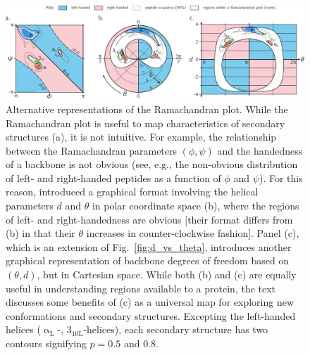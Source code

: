 \documentclass[fleqn,10pt,lineno]{wlpeerj} %
\newcommand{\n}[1]{{\color{black}#1}} %
\newcommand{\Fig}[1]{Fig.~\ref{#1}}
\begin{document}
\begin{figure}[t!]
\begin{adjustwidth}{-1in}{0in} %
\centering
\includegraphics[width=1.0\linewidth]{./figures/various_2d_distributions.pdf}
\caption{\label{fig:alternatives} 
\n{Alternative representations of the Ramachandran plot. While the Ramachandran plot is useful to map characteristics of secondary structures (a), it is not intuitive. For example, the relationship between the Ramachandran parameters $(\phi,\psi)$ and the handedness of a backbone is not obvious (see, e.g., the non-obvious distribution of left- and right-handed peptides as a function of $\phi$ and $\psi$). For this reason, \cite{Zacharias2013} introduced a graphical format involving the helical parameters $d$ and $\theta$ in polar coordinate space (b), where the regions of left- and right-handedness are obvious [their format differs from (b) in that their $\theta$ increases in counter-clockwise fashion]. Panel (c), which is an extension of \Fig{fig:d_vs_theta}, introduces another graphical representation of backbone degrees of freedom based on $(\theta,d)$, but  in Cartesian space. While both (b) and (c) are equally useful in understanding regions available to a protein, the text discusses some benefits of (c) as a universal map for exploring new conformations and secondary structures. Excepting the left-handed helices ($\upalpha_\textrm{L}$-, $3_\textrm{10L}$-helices), each secondary structure has two contours signifying $p=0.5$ and $0.8$.
} 
}
\end{adjustwidth}
\end{figure}
\end{document}
